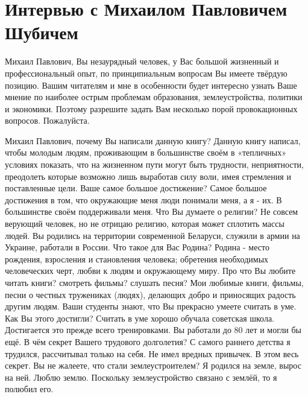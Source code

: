 ﻿\chapter[Интервью с М.\,П.~Шубичем]{Интервью с Михаилом Павловичем Шубичем}

\begin{drama}
	\setlength{\speaksindent}{5em}
	\setlength{\Dlabelsep}{5em}
	
	\maxspeaks Михаил Павлович, Вы незаурядный человек, у Вас большой жизненный и профессиональный опыт, по принципиальным вопросам Вы имеете твёрдую позицию. Вашим читателям и мне в особенности будет интересно узнать Ваше мнение по наиболее острым проблемам образования, землеустройства, политики и экономики. Поэтому разрешите задать Вам несколько порой провокационных вопросов.
	\michaelspeaks Пожалуйста.
	
	\maxspeaks Михаил Павлович, почему Вы написали данную книгу?
	\michaelspeaks Данную книгу написал, чтобы молодым людям, проживающим в большинстве своём в «тепличных» условиях показать, что на жизненном пути могут быть трудности, неприятности, преодолеть которые возможно лишь выработав силу воли, имея стремления и поставленные цели.
	\maxspeaks Ваше самое большое достижение?
	\michaelspeaks Самое большое достижения в том, что окружающие меня люди понимали меня, а я - их. В большинстве своём поддерживали меня.
	\maxspeaks Что Вы думаете о религии? 
	\michaelspeaks Не совсем верующий человек, но не отрицаю религию, которая может сплотить массы людей.
	\maxspeaks Вы родились на территории современной Беларуси, служили в армии на Украине, работали в России. Что такое для Вас Родина?
	\michaelspeaks Родина - место рождения, взросления и становления человека; обретения необходимых человеческих черт, любви к людям и окружающему миру.
	\maxspeaks Про что Вы любите читать книги? смотреть фильмы? слушать песня?
	\michaelspeaks Мои любимые книги, фильмы, песни о честных тружениках (людях), делающих добро и приносящих радость другим людям.
	\maxspeaks Ваши студенты знают, что Вы прекрасно умеете считать в уме. Как Вы этого достигли?
	\michaelspeaks Считать в уме хорошо обучала советская школа. Достигается это прежде всего тренировками.
	\maxspeaks Вы работали до 80 лет и могли бы ещё. В чём секрет Вашего трудового долголетия?
	\michaelspeaks С самого раннего детства я трудился, рассчитывал только на себя. Не имел вредных привычек. В этом весь секрет. 
	\maxspeaks Вы не жалеете, что стали землеустроителем?
	\michaelspeaks Я родился на земле, вырос на ней. Люблю землю. Поскольку землеустройство связано с землёй, то я полюбил его.
	

\end{drama}
